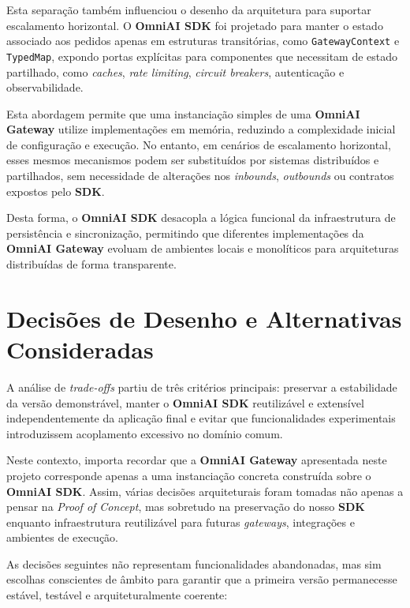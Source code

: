 Esta separação também influenciou o desenho da arquitetura para suportar escalamento horizontal. O \textbf{OmniAI SDK} foi projetado para manter o estado associado aos pedidos apenas em estruturas transitórias, como \texttt{GatewayContext} e \texttt{TypedMap}, expondo portas explícitas para componentes que necessitam de estado partilhado, como \textit{caches}, \textit{rate limiting}, \textit{circuit breakers}, autenticação e observabilidade.

Esta abordagem permite que uma instanciação simples de uma \textbf{OmniAI Gateway} utilize implementações em memória, reduzindo a complexidade inicial de configuração e execução. No entanto, em cenários de escalamento horizontal, esses mesmos mecanismos podem ser substituídos por sistemas distribuídos e partilhados, sem necessidade de alterações nos \textit{inbounds}, \textit{outbounds} ou contratos expostos pelo \textbf{SDK}.

Desta forma, o \textbf{OmniAI SDK} desacopla a lógica funcional da infraestrutura de persistência e sincronização, permitindo que diferentes implementações da \textbf{OmniAI Gateway} evoluam de ambientes locais e monolíticos para arquiteturas distribuídas de forma transparente.

\section{Decisões de Desenho e Alternativas Consideradas}

A análise de \textit{trade-offs} partiu de três critérios principais: preservar a estabilidade da versão demonstrável, manter o \textbf{OmniAI SDK} reutilizável e extensível independentemente da aplicação final e evitar que funcionalidades experimentais introduzissem acoplamento excessivo no domínio comum.

Neste contexto, importa recordar que a \textbf{OmniAI Gateway} apresentada neste projeto corresponde apenas a uma instanciação concreta construída sobre o \textbf{OmniAI SDK}. Assim, várias decisões arquiteturais foram tomadas não apenas a pensar na \textit{Proof of Concept}, mas sobretudo na preservação do nosso \textbf{SDK} enquanto infraestrutura reutilizável para futuras \textit{gateways}, integrações e ambientes de execução.

As decisões seguintes não representam funcionalidades abandonadas, mas sim escolhas conscientes de âmbito para garantir que a primeira versão permanecesse estável, testável e arquiteturalmente coerente:

